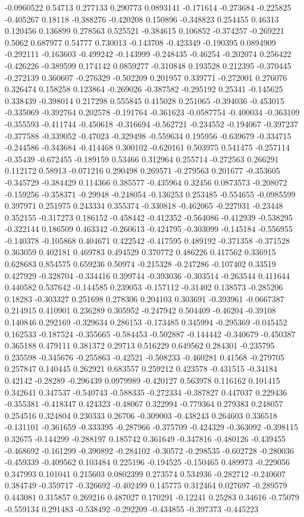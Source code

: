 -0.0960522 0.54713 0.277133 0.290773 0.0893141 -0.171614 -0.273684 -0.225825 -0.405267 0.18118 -0.388276 -0.420208 0.150896 -0.348823 0.254455 0.46313 0.120456 0.136899 0.278563 0.525521 -0.384615 0.106852 -0.374257 -0.269221 0.5062 0.687977 0.54777 0.730013 -0.143708 -0.423349 -0.190395 0.0894909 -0.292111 -0.163603 -0.499242 -0.143999 -0.248435 -0.46254 -0.202074 0.256422 -0.426226 -0.389599 0.174142 0.0859277 -0.310848 0.193528 0.212395 -0.370445 -0.272139 0.360607 -0.276329 -0.502209 0.201957 0.339771 -0.272001 0.276076 0.326474 0.158258 0.123864 -0.269026 -0.387582 -0.295192 0.25341 -0.145625 0.338439 -0.398014 0.217298 0.555845 0.415028 0.251065 -0.394036 -0.453015 -0.335069 -0.392764 0.202578 -0.191764 -0.361623 -0.0587754 -0.400034 -0.363109 -0.355593 -0.411744 -0.450618 -0.316694 -0.562721 -0.234552 -0.194067 -0.397237 -0.377588 -0.339052 -0.47023 -0.329498 -0.559634 0.195956 -0.639679 -0.334715 -0.244586 -0.343684 -0.414468 0.300102 -0.620161 0.503975 0.541475 -0.257114 -0.35439 -0.672455 -0.189159 0.53466 0.312964 0.255714 -0.272563 0.266291 0.112172 0.58913 -0.071216 0.290498 0.269571 -0.279563 0.201677 -0.353605 -0.345729 -0.384429 0.114366 0.385577 -0.435964 0.32456 0.0873573 -0.208072 -0.159256 -0.358371 -0.29948 -0.248054 -0.136253 0.253485 -0.554655 -0.0985599 0.397971 0.251975 0.243334 0.355374 -0.330818 -0.462065 -0.227931 -0.23448 0.352155 -0.317273 0.186152 -0.458442 -0.412352 -0.564086 -0.412939 -0.538295 -0.322144 0.186509 0.463342 -0.260613 -0.424795 -0.303099 -0.145184 -0.556955 -0.140378 -0.105868 0.404671 0.422542 -0.417595 0.489192 -0.371358 -0.371528 0.363059 0.402181 0.469783 0.494529 0.370772 0.486226 0.417562 0.336915 0.628683 0.854575 0.659236 0.50974 -0.215328 -0.247286 -0.107402 0.33519 0.427929 -0.328704 -0.334416 0.399744 -0.393036 -0.303514 -0.263544 0.411644 0.440582 0.537642 -0.144585 0.239053 -0.157112 -0.31402 0.138573 -0.285206 0.18283 -0.303327 0.251698 0.278306 0.204103 0.303691 -0.393961 -0.0667387 0.214915 0.410901 0.236289 0.305952 -0.247942 0.504409 -0.46204 -0.39108 0.140846 0.292169 -0.329634 0.286153 -0.173485 0.345994 -0.295369 -0.045452 0.162533 -0.187524 -0.355665 -0.584453 -0.502887 -0.144442 -0.340679 -0.450387 0.365188 0.479111 0.381372 0.29713 0.516229 0.649562 0.284301 -0.235795 0.235598 -0.345676 -0.255863 -0.42521 -0.508233 -0.460281 0.41568 -0.279705 0.257847 0.140445 0.262921 0.683557 0.259212 0.423578 -0.431515 -0.34184 0.42142 -0.28289 -0.296439 0.0979989 -0.420127 0.563978 0.116162 0.101415 0.342641 0.347537 -0.540743 -0.588335 -0.272334 -0.387827 0.447037 0.229436 -0.355381 -0.418347 0.424323 -0.48067 0.322994 -0.779364 0.279383 0.248057 0.254516 0.324804 0.230333 0.26706 -0.309003 -0.438243 0.264603 0.336518 -0.131101 -0.361659 -0.333395 -0.287966 -0.375709 -0.424329 -0.363092 -0.398115 0.32675 -0.144299 -0.288197 0.185742 0.361649 -0.347816 -0.480126 -0.439455 -0.468692 -0.161299 -0.390892 -0.284102 -0.30572 -0.298535 -0.602728 -0.280036 -0.459339 -0.409562 0.103484 0.225196 -0.194525 -0.150465 0.489973 -0.229056 0.347993 0.101041 0.215603 0.0802399 0.273574 0.534936 -0.282712 -0.240607 0.384749 -0.359717 -0.326692 -0.402499 0.145775 0.312464 0.027697 -0.289579 0.443081 0.315857 0.269216 0.487027 0.170291 -0.12241 0.25283 0.34616 -0.75079 -0.559134 0.291483 -0.538492 -0.292209 -0.434855 -0.397373 -0.445223 
